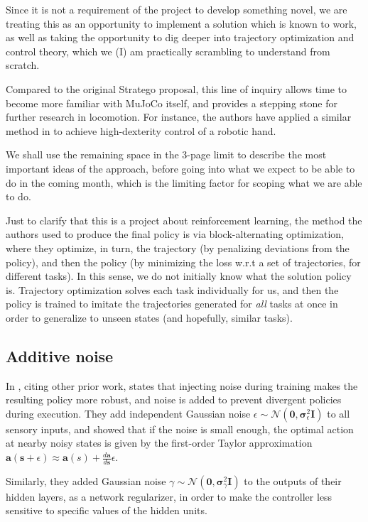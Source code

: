 \documentclass{article}
\newcommand{\bvec}[1]{\boldsymbol{#1}}
\begin{document}
Since it is not a requirement of the project to develop something novel, we are treating this as an opportunity to implement a solution which is known to work, as well as taking the opportunity to dig deeper into trajectory optimization and control theory, which we (I) am practically scrambling to understand from scratch.

Compared to the original Stratego proposal, this line of inquiry allows time to become more familiar with MuJoCo itself, and provides a stepping stone for further research in locomotion. For instance, the authors have applied a similar method in \cite{mordatch2012contact} to achieve high-dexterity control of a robotic hand.

We shall use the remaining space in the 3-page limit to describe the most important ideas of the approach, before going into what we expect to be able to do in the coming month, which is the limiting factor for scoping what we are able to do.

Just to clarify that this is a project about reinforcement learning, the method the authors used to produce the final policy is via block-alternating optimization, where they optimize, in turn, the trajectory (by penalizing deviations from the policy), and then the policy (by minimizing the loss w.r.t a set of trajectories, for different tasks). In this sense, we do not initially know what the solution policy is. Trajectory optimization solves each task individually for us, and then the policy is trained to imitate the trajectories generated for \textit{all} tasks at once in order to generalize to unseen states (and hopefully, similar tasks).

\subsection{Additive noise}
In \cite{mordatch2015interactive}, citing other prior work, states that injecting noise during training makes the resulting policy more robust, and noise is added to prevent divergent policies during execution. They add independent Gaussian noise $\epsilon \sim \mathcal{N}(\bvec{0}, \bvec{\sigma}^2_{\epsilon}\bvec{I})$ to all sensory inputs, and showed that if the noise is small enough, the optimal action at nearby noisy states is given by the first-order Taylor approximation $\bvec{a}(\bvec{s}+\epsilon) \approx \bvec{a}(s) + \frac{d\bvec{a}}{d\bvec{s}}\epsilon$.

Similarly, they added Gaussian noise $\gamma \sim \mathcal{N}(\bvec{0}, \bvec{\sigma}^2_{\gamma}\bvec{I})$ to the outputs of their hidden layers, as a network regularizer, in order to make the controller less sensitive to specific values of the hidden units.
\end{document}
